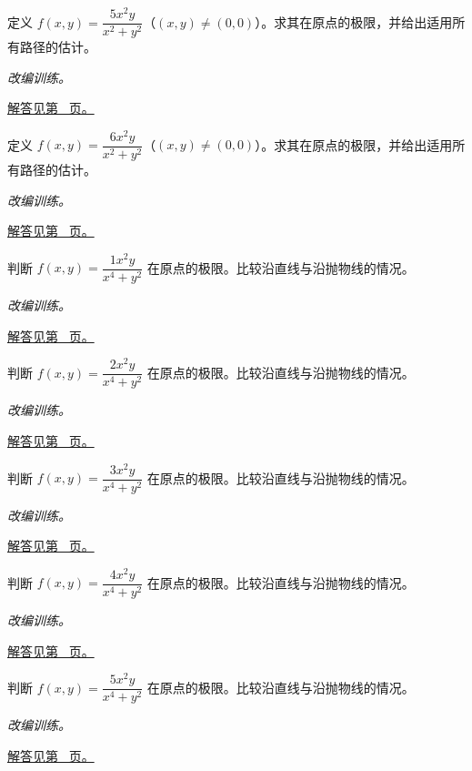 \documentclass[12pt,fontset=fandol]{ctexart}
\begin{document}
\begin{example}[极坐标估计证明极限]\label{ex:c32q6}
定义 $f(x,y)=\dfrac{5x^2y}{x^2+y^2}$（$(x,y)\ne(0,0)$）。求其在原点的极限，并给出适用所有路径的估计。
\par\textit{改编训练。}\par\hyperref[ans:c32q6]{解答见第~\pageref{ans:c32q6} 页。}
\end{example}
\begin{example}[极坐标估计证明极限]\label{ex:c32q7}
定义 $f(x,y)=\dfrac{6x^2y}{x^2+y^2}$（$(x,y)\ne(0,0)$）。求其在原点的极限，并给出适用所有路径的估计。
\par\textit{改编训练。}\par\hyperref[ans:c32q7]{解答见第~\pageref{ans:c32q7} 页。}
\end{example}
\begin{example}[直线路径一致仍可能无极限]\label{ex:c32q8}
判断 $f(x,y)=\dfrac{1x^2y}{x^4+y^2}$ 在原点的极限。比较沿直线与沿抛物线的情况。
\par\textit{改编训练。}\par\hyperref[ans:c32q8]{解答见第~\pageref{ans:c32q8} 页。}
\end{example}
\begin{example}[直线路径一致仍可能无极限]\label{ex:c32q9}
判断 $f(x,y)=\dfrac{2x^2y}{x^4+y^2}$ 在原点的极限。比较沿直线与沿抛物线的情况。
\par\textit{改编训练。}\par\hyperref[ans:c32q9]{解答见第~\pageref{ans:c32q9} 页。}
\end{example}
\begin{example}[直线路径一致仍可能无极限]\label{ex:c32q10}
判断 $f(x,y)=\dfrac{3x^2y}{x^4+y^2}$ 在原点的极限。比较沿直线与沿抛物线的情况。
\par\textit{改编训练。}\par\hyperref[ans:c32q10]{解答见第~\pageref{ans:c32q10} 页。}
\end{example}
\begin{example}[直线路径一致仍可能无极限]\label{ex:c32q11}
判断 $f(x,y)=\dfrac{4x^2y}{x^4+y^2}$ 在原点的极限。比较沿直线与沿抛物线的情况。
\par\textit{改编训练。}\par\hyperref[ans:c32q11]{解答见第~\pageref{ans:c32q11} 页。}
\end{example}
\begin{example}[直线路径一致仍可能无极限]\label{ex:c32q12}
判断 $f(x,y)=\dfrac{5x^2y}{x^4+y^2}$ 在原点的极限。比较沿直线与沿抛物线的情况。
\par\textit{改编训练。}\par\hyperref[ans:c32q12]{解答见第~\pageref{ans:c32q12} 页。}
\end{example}
\end{document}

